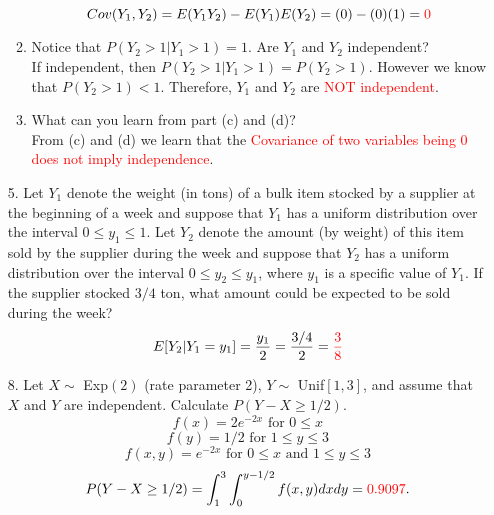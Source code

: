 \documentclass{article}
\begin{document}
\begin{enumerate}
\begin{enumerate}
    \[
    Cov(Y_1,Y_2) = E(Y_1Y_2) - E(Y_1)E(Y_2)=(0)-(0)(1)=\textcolor{red}{0}
    \]
    \item Notice that $P(Y_2 > 1 | Y_1 > 1) = 1$. Are $Y_1$ and $Y_2$ independent?\\
    If independent, then $P(Y_2 > 1 | Y_1 > 1)=P(Y_2 > 1)$. However we know that $P(Y_2 > 1) < 1$. Therefore, $Y_1$ and $Y_2$ are \textcolor{red}{NOT independent}.
    \item What can you learn from part (c) and (d)?\\
    From (c) and (d) we learn that the \textcolor{red}{Covariance of two variables being 0 does not imply independence}.
\end{enumerate}
    \item [5.] Let $Y_1$ denote the weight (in tons) of a bulk item stocked by a supplier at the beginning of a week and suppose that $Y_1$ has a uniform distribution over the interval $0 \leq y_1 \leq 1$. Let $Y_2$ denote the amount (by weight) of this item sold by the supplier during the week and suppose that $Y_2$ has a uniform distribution over the interval $0 \leq y_2 \leq y_1$, where $y_1$ is a specific value of $Y_1$. If the supplier stocked $3/4$ ton, what amount could be expected to be sold during the week?
    \[
    E[Y_2|Y_1=y_1]=\frac{y_1}{2} = \frac{3/4}{2}=\textcolor{red}{\frac{3}{8}}
    \]
    \item [8.] Let $X \sim$ Exp$(2)$ (rate parameter 2), $Y \sim$ Unif$[1, 3]$, and assume that $X$ and $Y$ are independent. Calculate $P (Y - X \geq 1/2)$.
    \[
    f(x)=2e^{-2x} \text{ for } 0 \leq x
    \]
    \[
    f(y)=1/2 \text{ for } 1 \leq y \leq 3
    \]
    \[
    f(x,y)=e^{-2x} \text{ for } 0 \leq x \text{ and } 1 \leq y \leq 3
    \]
    \[
    P(Y - X \geq 1/2) = \int_1^3 \int_0^{y-1/2} f(x,y) dxdy = \textcolor{red}{0.9097}.
    \]

\end{enumerate}
\end{document}
